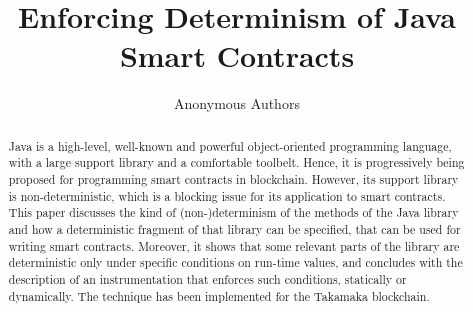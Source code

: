 \documentclass[orivec]{llncs}
\begin{document}
%
\begin{frontmatter}
  \title{Enforcing Determinism of Java Smart Contracts}
  \author{Anonymous Authors}
%
\maketitle
%
\begin{abstract}
  Java is a high-level, well-known and powerful object-oriented programming
  language, with a large support library and a comfortable toolbelt.
  Hence, it is progressively being proposed for programming smart contracts
  in blockchain. However, its support library is non-deterministic,
  which is a blocking issue for its application to smart contracts.
  This paper discusses the kind of (non-)determinism of the methods
  of the Java library and how a deterministic fragment of that library can be specified,
  that can be used for writing smart contracts. Moreover, it
  shows that some relevant parts of the library are deterministic
  only under specific conditions on run-time values,
  and concludes with the description of
  an instrumentation that enforces such conditions, statically or dynamically.
  The technique has been implemented for the Takamaka blockchain.
\end{abstract}
%
\end{frontmatter}









\end{document}
